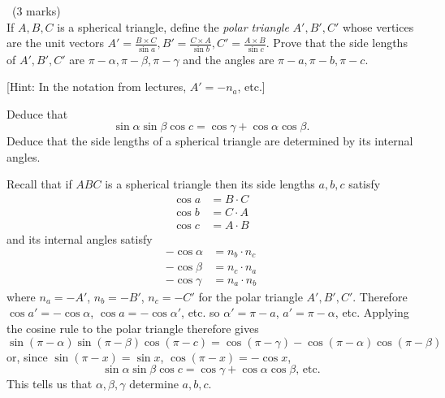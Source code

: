 \documentclass[12pt]{article}
\begin{document}
\vspace{1cm}

\begin{question}\ (3 marks)\\
  If $A,B,C$ is a spherical triangle, define the {\em polar triangle} $A',B',C'$ whose vertices are the unit vectors $A'=\frac{B\times C}{\sin a},B'=\frac{C\times A}{\sin b},C'=\frac{A\times B}{\sin c}$. Prove that the side lengths of $A',B',C'$ are $\pi-\alpha,\pi-\beta,\pi-\gamma$ and the angles are $\pi-a,\pi-b,\pi-c$.

  [Hint: In the notation from lectures, $A'=-n_a$, etc.]
  
  Deduce that
  \[\sin\alpha\sin\beta\cos c=\cos\gamma+\cos\alpha\cos\beta.\]
  Deduce that the side lengths of a spherical triangle are determined by its internal angles.
\end{question}

\begin{answer}
  Recall that if $ABC$ is a spherical triangle then its side lengths $a,b,c$ satisfy
  \begin{align*}
    \cos a&=B\cdot C\\
    \cos b&=C\cdot A\\
    \cos c&=A\cdot B
  \end{align*}
  and its internal angles satisfy
  \begin{align*}
    -\cos\alpha&=n_b\cdot n_c\\
    -\cos\beta&=n_c\cdot n_a\\
    -\cos\gamma&=n_a\cdot n_b
  \end{align*}
  where $n_a=-A'$, $n_b=-B'$, $n_c=-C'$ for the polar triangle $A',B',C'$. Therefore $\cos a'=-\cos\alpha$, $\cos a=-\cos\alpha'$, etc. so $\alpha'=\pi-a$, $a'=\pi-\alpha$, etc. Applying the cosine rule to the polar triangle therefore gives
  \[\sin(\pi-\alpha)\sin(\pi-\beta)\cos(\pi-c)=\cos(\pi-\gamma)-\cos(\pi-\alpha)\cos(\pi-\beta)\]
  or, since $\sin(\pi-x)=\sin x$, $\cos(\pi-x)=-\cos x$,
  \[\sin\alpha\sin\beta\cos c=\cos\gamma+\cos\alpha\cos\beta\mbox{, etc.}\]
  This tells us that $\alpha,\beta,\gamma$ determine $a,b,c$.
\end{answer}
\newpage
\end{document}
